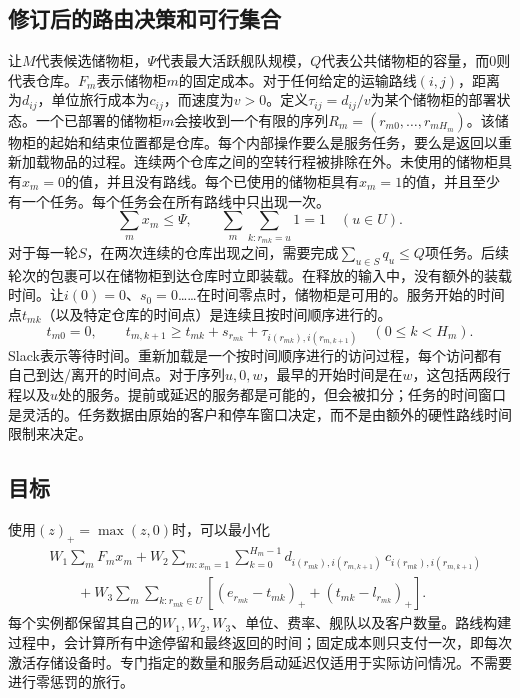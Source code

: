 \documentclass[11pt]{article}
\begin{document}
\subsection*{修订后的路由决策和可行集合}
让$M$代表候选储物柜，$\Psi$代表最大活跃舰队规模，$Q$代表公共储物柜的容量，而$0$则代表仓库。$F_m$表示储物柜$m$的固定成本。对于任何给定的运输路线$(i,j)$，距离为$d_{ij}$，单位旅行成本为$c_{ij}$，而速度为$v>0$。定义$\tau_{ij}=d_{ij}/v$为某个储物柜的部署状态。一个已部署的储物柜$m$会接收到一个有限的序列$R_m=(r_{m0},\ldots,r_{mH_m})$。该储物柜的起始和结束位置都是仓库。每个内部操作要么是服务任务，要么是返回以重新加载物品的过程。连续两个仓库之间的空转行程被排除在外。未使用的储物柜具有$x_m=0$的值，并且没有路线。每个已使用的储物柜具有$x_m=1$的值，并且至少有一个任务。每个任务会在所有路线中只出现一次。
\[
 \sum_m x_m\le\Psi,\qquad
 \sum_m\sum_{k:r_{mk}=u}1=1\quad(u\in U).
\]
对于每一轮$S$，在两次连续的仓库出现之间，需要完成$\sum_{u\in S}q_u\le Q$项任务。后续轮次的包裹可以在储物柜到达仓库时立即装载。在释放的输入中，没有额外的装载时间。让$i(0)=0$、$s_0=0$……在时间零点时，储物柜是可用的。服务开始的时间点$t_{mk}$（以及特定仓库的时间点）是连续且按时间顺序进行的。
\[
 t_{m0}=0,\qquad
 t_{m,k+1}\ge t_{mk}+s_{r_{mk}}+\tau_{i(r_{mk}),i(r_{m,k+1})}
 \quad(0\le k<H_m).
\]
Slack表示等待时间。重新加载是一个按时间顺序进行的访问过程，每个访问都有自己到达/离开的时间点。对于序列$u,0,w$，最早的开始时间是在$w$，这包括两段行程以及$u$处的服务。提前或延迟的服务都是可能的，但会被扣分；任务的时间窗口是灵活的。任务数据由原始的客户和停车窗口决定，而不是由额外的硬性路线时间限制来决定。

\subsection*{目标}
使用$(z)_+=\max(z,0)$时，可以最小化
\[
 \begin{aligned}
 &W_1\sum_m F_m x_m+
 W_2\sum_{m:x_m=1}\sum_{k=0}^{H_m-1}
       d_{i(r_{mk}),i(r_{m,k+1})}\,c_{i(r_{mk}),i(r_{m,k+1})}\\
 &\qquad{}+ W_3\sum_m\sum_{k:r_{mk}\in U}
       \left[(e_{r_{mk}}-t_{mk})_++(t_{mk}-l_{r_{mk}})_+\right].
 \end{aligned}
\]
每个实例都保留其自己的$W_1,W_2,W_3$、单位、费率、舰队以及客户数量。路线构建过程中，会计算所有中途停留和最终返回的时间；固定成本则只支付一次，即每次激活存储设备时。专门指定的数量和服务启动延迟仅适用于实际访问情况。不需要进行零惩罚的旅行。
\end{document}
